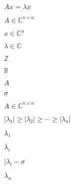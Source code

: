 \documentclass{article}
\begin{document}
$Ax=\lambda x$
\pagebreak

$A\in \mathbb{C}^{n\times n}$
\pagebreak

$x \in \mathbb{C}^n$
\pagebreak

$\lambda \in \mathbb{C}$
\pagebreak

$\mathbb{Z}$
\pagebreak

$\mathbb{R}$
\pagebreak

$A$
\pagebreak

$\sigma$
\pagebreak

$A \in \mathbb{C}^{n\times n}$
\pagebreak

$|\lambda_1| \ge |\lambda_2| \ge \cdots \ge |\lambda_n|$
\pagebreak

$\lambda_1$
\pagebreak

$\lambda_i$
\pagebreak

$|\lambda_i - \sigma $
\pagebreak

$\lambda_n$
\pagebreak
\end{document}
